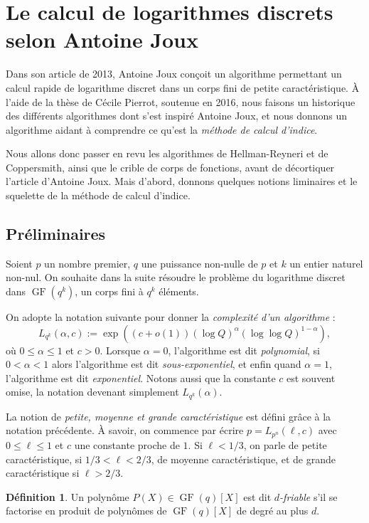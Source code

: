 \documentclass[a4paper, titlepage, 11pt]{article}
\theoremstyle{definition}
\newtheorem{defi}[theo]{Définition}
\theoremstyle{remark}
\def\o{o}
\def\gf{\operatorname{GF}}
\begin{document}
\section{Le calcul de logarithmes discrets selon Antoine Joux}\label{sec:DLPJoux} 

Dans son article \cite{joux2013} de 2013, Antoine Joux conçoit un algorithme permettant un calcul rapide de logarithme discret dans un corps fini de petite caractéristique. À l'aide de la thèse \cite{pierrot2016} de Cécile Pierrot, soutenue en 2016, nous faisons un historique des différents algorithmes dont s'est inspiré Antoine Joux, et nous donnons un algorithme aidant à comprendre ce qu'est la \textit{méthode de calcul d'indice}.

Nous allons donc passer en revu les algorithmes de Hellman-Reyneri et de Coppersmith, ainsi que le crible de corps de fonctions, avant de décortiquer l'article \cite{joux2013} d'Antoine Joux. Mais d’abord, donnons quelques notions liminaires et le squelette de la méthode de calcul d’indice.

\subsection{Préliminaires}

Soient $p$ un nombre premier, $q$ une puissance non-nulle de $p$ et $k$ un entier naturel non-nul. On souhaite dans la suite résoudre le problème du logarithme discret dans $\gf(q^k)$, un corps fini à $q^k$ éléments.

On adopte la notation suivante pour donner la \textit{complexité d'un algorithme} :
$$L_{q^k}(\alpha, c) := \exp\left({(c+\o(1))(\log Q)^\alpha(\log\log Q)^{1 - \alpha}}\right),$$
où $0 \leqslant \alpha\leqslant 1$ et $c > 0$. Lorsque $\alpha = 0$, l'algorithme est dit \textit{polynomial}, si $0 < \alpha < 1$ alors l'algorithme est dit \textit{sous-exponentiel}, et enfin quand $\alpha = 1$, l'algorithme est dit \textit{exponentiel}. Notons aussi que la constante $c$ est souvent omise, la notation devenant simplement $L_{q^k}(\alpha)$. 

La notion de \textit{petite, moyenne et grande caractéristique} est défini grâce à la notation précédente. À savoir, on commence par écrire $p = L_{p^n}(\ell,c)$ avec $0\leqslant\ell\leqslant 1$ et $c$ une constante proche de $1$. Si $\ell < 1/3$, on parle de petite caractéristique, si $1/3 < \ell < 2/3$, de moyenne caractéristique, et de grande caractéristique si $\ell > 2/3$.

\begin{defi}
Un polynôme $P(X) \in \gf(q)[X]$ est dit \textit{$d$-friable} s'il se factorise en produit de polynômes de $\gf(q)[X]$ de degré au plus $d$.
\end{defi}
\end{document}
